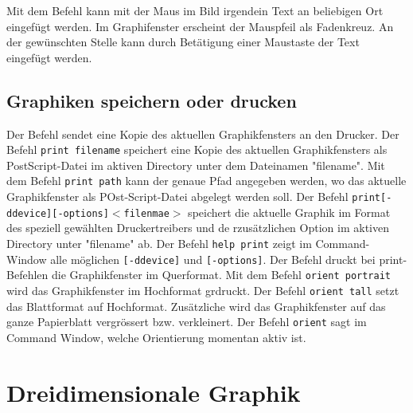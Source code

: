 \newline\newline
Mit dem Befehl  kann mit der Maus im Bild irgendein Text an beliebigen Ort eingefügt werden. Im Graphifenster erscheint der Mauspfeil als Fadenkreuz. An der gewünschten Stelle kann durch Betätigung einer Maustaste der Text eingefügt werden.
\subsection{Graphiken speichern oder drucken}
Der Befehl  sendet eine Kopie des aktuellen Graphikfensters an den Drucker. Der Befehl {\color{red}\texttt{print filename}} speichert eine Kopie des aktuellen Graphikfensters als PostScript-Datei im aktiven Directory unter dem Dateinamen "filename". Mit dem Befehl {\color{red}\texttt{print path}} kann der genaue Pfad angegeben werden, wo das aktuelle Graphikfenster als POst-Script-Datei abgelegt werden soll. Der Befehl {\color{red}\texttt{print[-ddevice][-options]$<$filenmae$>$}} speichert die aktuelle Graphik im Format des speziell gewählten Druckertreibers und de rzusätzlichen Option im aktiven Directory unter "filename" ab. Der Befehl {\color{red}\texttt{help print}} zeigt im Command-Window alle möglichen \texttt{[-ddevice]} und \texttt{[-options]}.
\newline\newline
Der Befehl  druckt bei print-Befehlen die Graphikfenster im Querformat. Mit dem Befehl {\color{red}\texttt{orient portrait}} wird das Graphikfenster im Hochformat grdruckt. Der Befehl {\color{red}\texttt{orient tall}} setzt das Blattformat auf Hochformat. Zusätzliche wird das Graphikfenster auf das ganze Papierblatt vergrössert bzw. verkleinert. Der Befehl {\color{red}\texttt{orient}} sagt im Command Window, welche Orientierung momentan aktiv ist.
\section{Dreidimensionale Graphik}
